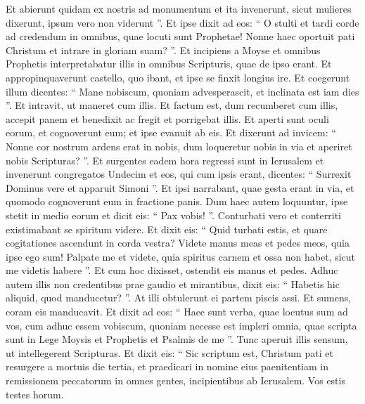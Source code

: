 \begin{biblechapter}
\begin{biblechapter}
\begin{biblechapter}
\begin{biblechapter}
\begin{biblechapter}
\begin{biblechapter}
\begin{biblechapter}
\begin{biblechapter}
\begin{biblechapter}
\begin{biblechapter}
\begin{biblechapter}
\begin{biblechapter}
\begin{biblechapter}
\begin{biblechapter}
\begin{biblechapter}
\begin{biblechapter}
\begin{biblechapter}
\begin{biblechapter}
\begin{biblechapter}
\begin{biblechapter}
\begin{biblechapter}
\begin{biblechapter}
\begin{biblechapter}
\begin{biblechapter}
\verse Et abierunt quidam ex nostris ad monumentum et ita invenerunt, sicut mulieres dixerunt, ipsum vero non viderunt ”.
 \verse Et ipse dixit ad eos: “ O stulti et tardi corde ad credendum in omnibus, quae locuti sunt Prophetae! 
\verse Nonne haec oportuit pati Christum et intrare in gloriam suam? ”. 
\verse Et incipiens a Moyse et omnibus Prophetis interpretabatur illis in omnibus Scripturis, quae de ipso erant. 
\verse Et appropinquaverunt castello, quo ibant, et ipse se finxit longius ire. 
\verse Et coegerunt illum dicentes: “ Mane nobiscum, quoniam advesperascit, et inclinata est iam dies ”. Et intravit, ut maneret cum illis. 
\verse Et factum est, dum recumberet cum illis, accepit panem et benedixit ac fregit et porrigebat illis. 
 \verse Et aperti sunt oculi eorum, et cognoverunt eum; et ipse evanuit ab eis. 
 \verse Et dixerunt ad invicem: “ Nonne cor nostrum ardens erat in nobis, dum loqueretur nobis in via et aperiret nobis Scripturas? ”. 
\verse Et surgentes eadem hora regressi sunt in Ierusalem et invenerunt congregatos Undecim et eos, qui cum ipsis erant, 
\verse dicentes: “ Surrexit Dominus vere et apparuit Simoni ”. 
\verse Et ipsi narrabant, quae gesta erant in via, et quomodo cognoverunt eum in fractione panis.
 \verse Dum haec autem loquuntur, ipse stetit in medio eorum et dicit eis: “ Pax vobis! ”. 
\verse Conturbati vero et conterriti existimabant se spiritum videre. 
 \verse Et dixit eis: “ Quid turbati estis, et quare cogitationes ascendunt in corda vestra? 
\verse Videte manus meas et pedes meos, quia ipse ego sum! Palpate me et videte, quia spiritus carnem et ossa non habet, sicut me videtis habere ”. 
 \verse Et cum hoc dixisset, ostendit eis manus et pedes. 
\verse Adhuc autem illis non credentibus prae gaudio et mirantibus, dixit eis: “ Habetis hic aliquid, quod manducetur? ”. 
\verse At illi obtulerunt ei partem piscis assi. 
\verse Et sumens, coram eis manducavit.
 \verse Et dixit ad eos: “ Haec sunt verba, quae locutus sum ad vos, cum adhuc essem vobiscum, quoniam necesse est impleri omnia, quae scripta sunt in Lege Moysis et Prophetis et Psalmis de me ”. 
\verse Tunc aperuit illis sensum, ut intellegerent Scripturas. 
\verse Et dixit eis: “ Sic scriptum est, Christum pati et resurgere a mortuis die tertia, 
\verse et praedicari in nomine eius paenitentiam in remissionem peccatorum in omnes gentes, incipientibus ab Ierusalem. 
\verse Vos estis testes horum. 

\end{biblechapter}
\end{biblechapter}
\end{biblechapter}
\end{biblechapter}
\end{biblechapter}
\end{biblechapter}
\end{biblechapter}
\end{biblechapter}
\end{biblechapter}
\end{biblechapter}
\end{biblechapter}
\end{biblechapter}
\end{biblechapter}
\end{biblechapter}
\end{biblechapter}
\end{biblechapter}
\end{biblechapter}
\end{biblechapter}
\end{biblechapter}
\end{biblechapter}
\end{biblechapter}
\end{biblechapter}
\end{biblechapter}
\end{biblechapter}
